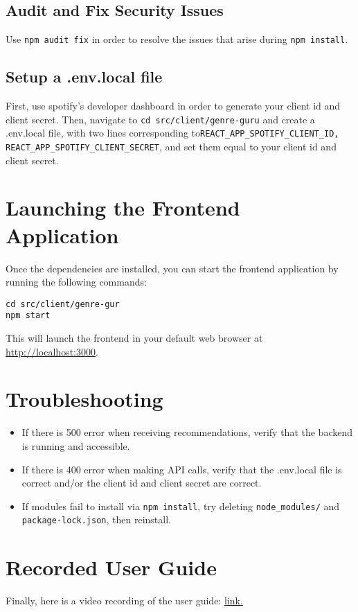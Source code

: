 \documentclass{article}
\begin{document}
\subsection{Audit and Fix Security Issues}
Use \texttt{npm audit fix} in order to resolve the issues that arise during \texttt{npm install}. 

\subsection{Setup a .env.local file}
First, use spotify's developer dashboard in order to generate your client id and client secret.
Then, navigate to \texttt{cd src/client/genre-guru} and create a .env.local file, with two lines corresponding to\texttt{REACT\_APP\_SPOTIFY\_CLIENT\_ID, REACT\_APP\_SPOTIFY\_CLIENT\_SECRET},
and set them equal to your client id and client secret.

\section{Launching the Frontend Application}
Once the dependencies are installed, you can start the frontend application by running the following commands:

\begin{verbatim}
cd src/client/genre-gur
npm start
\end{verbatim}

This will launch the frontend in your default web browser at \url{http://localhost:3000}.

\section{Troubleshooting}
\begin{itemize}
  \item If there is 500 error when receiving recommendations, verify that the backend is running and accessible.
  \item If there is 400 error when making API calls, verify that the .env.local file is correct and/or the client id and client secret are correct.
  \item If modules fail to install via \texttt{npm install}, try deleting \texttt{node\_modules/} and \texttt{package-lock.json}, then reinstall.
\end{itemize}

\section{Recorded User Guide}

Finally, here is a video recording of the user guide: \href{https://drive.google.com/file/d/1wVYMzri1Ggy7P0_b0EQj4uQOwrtJOPV2/view?usp=drive_link}{link.}
\end{document}
